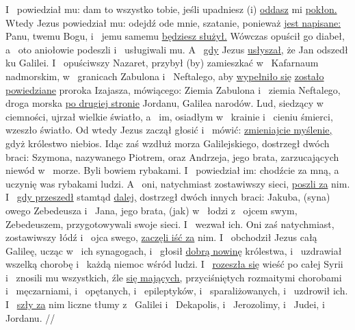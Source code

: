  I~ powiedział mu: dam to wszystko tobie, jeśli upadniesz (i) \underline{oddasz} mi \underline{pokłon.}
 Wtedy Jezus powiedział mu: odejdź ode mnie, szatanie, ponieważ \underline{jest napisane:} Panu, twemu Bogu,  i~ jemu samemu \underline{będziesz służył.}
 Wówczas opuścił go diabeł, a~ oto aniołowie podeszli i~ usługiwali mu.
 A~ \underline{gdy} Jezus \underline{usłyszał,} że Jan  odszedł ku Galilei.
 I~ opuściwszy Nazaret, przybył (by) zamieszkać w~ Kafarnaum nadmorskim, w~ granicach Zabulona i~ Neftalego,
 aby \underline{wypełniło się}  \underline{zostało powiedziane}  proroka Izajasza, mówiącego:
 Ziemia Zabulona i~ ziemia Neftalego, droga morska \underline{po drugiej stronie} Jordanu, Galilea narodów.
 Lud, siedzący w~ ciemności, ujrzał wielkie światło, a~ im, osiadłym w~ krainie i~ cieniu śmierci, wzeszło światło.
 Od wtedy Jezus zaczął głosić i~ mówić: \underline{zmieniajcie myślenie,} gdyż  królestwo niebios.
 Idąc zaś wzdłuż morza Galilejskiego, dostrzegł dwóch braci: Szymona, nazywanego Piotrem, oraz Andrzeja, jego brata, zarzucających niewód w~ morze. Byli bowiem rybakami.
 I~ powiedział im: chodźcie za mną, a~ uczynię was rybakami ludzi.
 A~ oni, natychmiast zostawiwszy sieci, \underline{poszli za} nim.
 I~ \underline{gdy przeszedł} stamtąd \underline{dalej,} dostrzegł dwóch innych braci: Jakuba, (syna) owego Zebedeusza i~ Jana, jego brata, (jak) w~ łodzi z~ ojcem swym, Zebedeuszem, przygotowywali swoje sieci. I~ wezwał ich.
 Oni zaś natychmiast, zostawiwszy łódź i~ ojca swego, \underline{zaczęli iść za} nim.
 I~ obchodził Jezus całą Galileę, ucząc w~ ich synagogach, i~ głosił \underline{dobrą nowinę} królestwa, i~ uzdrawiał wszelką chorobę i~ każdą niemoc wśród ludzi.
 I~ \underline{rozeszła się} wieść  po całej Syrii i~ znosili mu wszystkich, źle \underline{się mających,} przyciśniętych rozmaitymi chorobami i~ męczarniami, i~ opętanych, i~ epileptyków, i~ sparaliżowanych, i~ uzdrowił ich.
 I~ \underline{szły za} nim liczne tłumy z~ Galilei i~ Dekapolis, i~ Jerozolimy, i~ Judei, i~  Jordanu.
//
\endgl